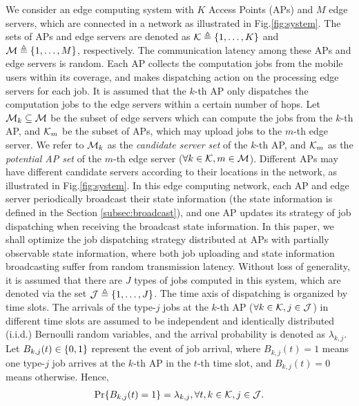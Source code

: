 We consider an edge computing system with $K$ Access Points (APs) and $M$ edge servers, which are connected in a network as illustrated in Fig.\ref{fig:system}.
The sets of APs and edge servers are denoted as $\mathcal{K} \triangleq \{1,\dots,K\}$ and $\mathcal{M} \triangleq \{1,\dots,M\}$, respectively.
The communication latency among these APs and edge servers is random.
Each AP collects the computation jobs from the mobile users within its coverage, and makes dispatching action on the processing edge servers for each job.
It is assumed that the $k$-th AP only dispatches the computation jobs to the edge servers within a certain number of hops.
Let $\mathcal{M}_{k} \subseteq \mathcal{M}$ be the subset of edge servers which can compute the jobs from the $k$-th AP, and $\mathcal{K}_{m}$ be the subset of APs, which may upload jobs to the $m$-th edge server.
We refer to $\mathcal{M}_{k}$ as the \emph{candidate server set} of the $k$-th AP, and $\mathcal{K}_{m}$ as the \emph{potential AP set} of the $m$-th edge server ($\forall k\in\mathcal{K}, m\in\mathcal{M}$).
Different APs may have different candidate servers according to their locations in the network, as illustrated in Fig.\ref{fig:system}.
In this edge computing network, each AP and edge server periodically broadcast their state information (the state information is defined in the Section \ref{subsec:broadcast}), and one AP updates its strategy of job dispatching when receiving the broadcast state information.
In this paper, we shall optimize the job dispatching strategy distributed at APs with partially observable state information, where both job uploading and state information broadcasting suffer from random transmission latency.
Without loss of generality, it is assumed that there are $J$ types of jobs computed in this system, which are denoted via the set $\mathcal{J} \triangleq \{1,\dots,J\}$.
The time axis of dispatching is organized by time slots.
The arrivals of the type-$j$ jobs at the $k$-th AP ($\forall k\in\mathcal{K},j\in\mathcal{J}$) in different time slots are assumed to be independent and identically distributed (i.i.d.) Bernoulli random variables, and the arrival probability is denoted as $\lambda_{k,j}$.
Let $B_{k,j}(t) \in \{0,1\}$ represent the event of job arrival, where $B_{k,j}(t)=1$ means one type-$j$ job arrives at the $k$-th AP in the $t$-th time slot, and $B_{k,j}(t)=0$ means otherwise.
Hence,
\begin{align}
    \Pr\{ B_{k,j}(t) = 1 \} = \lambda_{k,j}, \forall t,k\in\mathcal{K},j\in\mathcal{J}.
\end{align}


